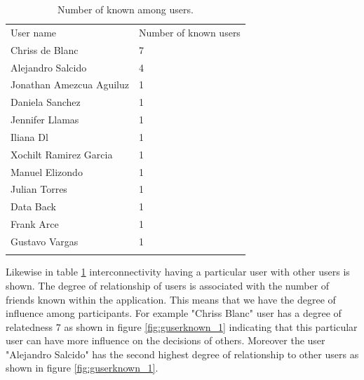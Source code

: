 \begin{table}
\small
\caption{Number of known among users.}
\label{tab:knownUsers_1} 
\centering
\small
\begin{tabular}{p{3cm} p{3cm}  }
\hline\noalign{\smallskip}
 User name & Number of known users \\
\noalign{\smallskip}\hline\noalign{\smallskip}
\small{Chriss de Blanc } & \small{7}  \\ \hline 
\small{Alejandro Salcido } & \small{4}  \\ \hline
\small{Jonathan Amezcua Aguiluz } & \small{1}  \\ \hline
\small{Daniela Sanchez } & \small{1}  \\ \hline
\small{Jennifer Llamas} & \small{1}  \\ \hline
\small{Iliana Dl } & \small{1}  \\ \hline
\small{Xochilt Ramirez Garcia } & \small{1}  \\ \hline
\small{Manuel Elizondo } & \small{1}  \\ \hline 
\small{Julian Torres } & \small{1}  \\ \hline 
\small{Data Back } & \small{1}  \\ \hline 
\small{Frank Arce } & \small{1}  \\ \hline 
\small{Gustavo Vargas } & \small{1}  \\ \hline 
\noalign{\smallskip}\hline
\end{tabular}
\end{table}

Likewise in table \ref{tab:knownUsers_1} interconnectivity having a particular
user with other users is shown. The degree of relationship of users is
associated with the number of friends known within the application. This means
that we have the degree of influence among participants. For example  "Chriss
Blanc" user has a degree of relatedness 7 as shown in figure
\ref{fig:guserknown_1} indicating that this particular user can have more
influence on the decisions of others. Moreover the user "Alejandro Salcido" has
the second highest degree of relationship to other users as shown in figure
\ref{fig:guserknown_1}.

